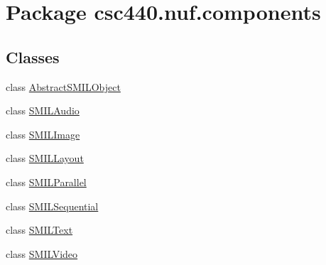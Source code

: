 \hypertarget{namespacecsc440_1_1nuf_1_1components}{\section{Package csc440.\-nuf.\-components}
\label{namespacecsc440_1_1nuf_1_1components}
}
\subsection*{Classes}
\begin{DoxyCompactItemize}
\item 
class \hyperlink{classcsc440_1_1nuf_1_1components_1_1_abstract_s_m_i_l_object}{Abstract\-S\-M\-I\-L\-Object}
\item 
class \hyperlink{classcsc440_1_1nuf_1_1components_1_1_s_m_i_l_audio}{S\-M\-I\-L\-Audio}
\item 
class \hyperlink{classcsc440_1_1nuf_1_1components_1_1_s_m_i_l_image}{S\-M\-I\-L\-Image}
\item 
class \hyperlink{classcsc440_1_1nuf_1_1components_1_1_s_m_i_l_layout}{S\-M\-I\-L\-Layout}
\item 
class \hyperlink{classcsc440_1_1nuf_1_1components_1_1_s_m_i_l_parallel}{S\-M\-I\-L\-Parallel}
\item 
class \hyperlink{classcsc440_1_1nuf_1_1components_1_1_s_m_i_l_sequential}{S\-M\-I\-L\-Sequential}
\item 
class \hyperlink{classcsc440_1_1nuf_1_1components_1_1_s_m_i_l_text}{S\-M\-I\-L\-Text}
\item 
class \hyperlink{classcsc440_1_1nuf_1_1components_1_1_s_m_i_l_video}{S\-M\-I\-L\-Video}
\end{DoxyCompactItemize}
